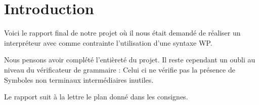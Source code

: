 \section{Introduction}
	Voici le rapport final de notre projet où il nous était demandé de
	réaliser un interpréteur avec comme contrainte l'utilisation d'une
	syntaxe WP. 

	Nous pensons avoir complété l'entièreté du projet. Il reste cependant
	un oubli au niveau du vérificateur de grammaire : Celui ci ne vérifie
	pas la présence de Symboles non terminaux intermédiaires inutiles. 

	Le rapport suit à la lettre le plan donné dans les consignes. 


